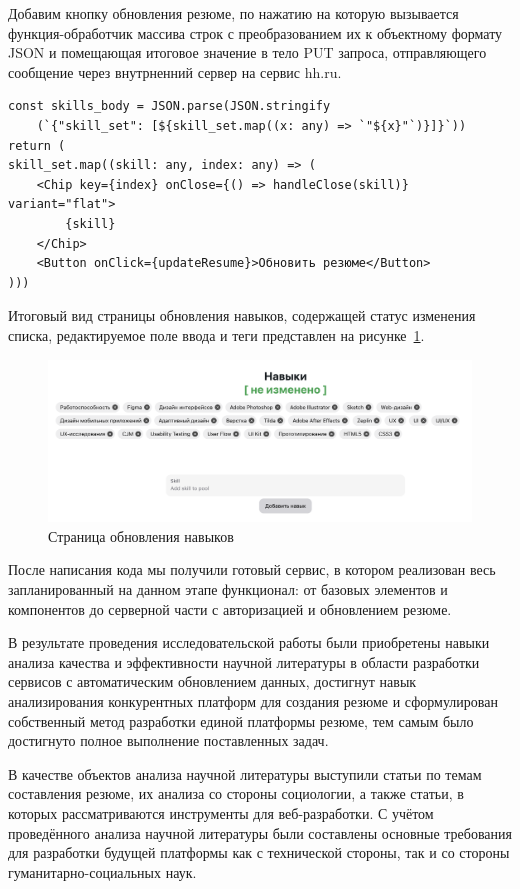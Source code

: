 \documentclass[master, och, diploma]{SCWorks}
\begin{document}
Добавим кнопку обновления резюме, по нажатию на которую вызывается функция-обработчик массива строк с преобразованием их к объектному формату JSON и помещающая итоговое значение в тело PUT запроса, отправляющего сообщение через внутрненний сервер на сервис hh.ru.
\begin{verbatim}
const skills_body = JSON.parse(JSON.stringify
    (`{"skill_set": [${skill_set.map((x: any) => `"${x}"`)}]}`))
return (
skill_set.map((skill: any, index: any) => (
    <Chip key={index} onClose={() => handleClose(skill)} variant="flat">
        {skill}
    </Chip>
    <Button onClick={updateResume}>Обновить резюме</Button>
)))
\end{verbatim}

Итоговый вид страницы обновления навыков, содержащей статус изменения списка, редактируемое поле ввода и теги представлен на рисунке~\ref{fig:32}. 
\begin{figure}[!ht]
    \centering
    \includegraphics[width=12cm]{images/image-update-skills.png}
    \caption{\label{fig:32}%
        Страница обновления навыков}
\end{figure}

После написания кода мы получили готовый сервис, в котором реализован весь запланированный на данном этапе функционал: от базовых элементов и компонентов до серверной части с авторизацией и обновлением резюме.



\newpage
\conclusion
В результате проведения исследовательской работы были приобретены навыки анализа 
качества и эффективности научной литературы в области разработки сервисов 
с автоматическим обновлением данных, достигнут навык анализирования конкурентных 
платформ для создания резюме и сформулирован собственный метод разработки 
единой платформы резюме, тем самым было достигнуто полное выполнение поставленных задач.

В качестве объектов анализа научной литературы выступили статьи по темам составления 
резюме, их анализа со стороны социологии, а также статьи, в которых рассматриваются 
инструменты для веб-разработки. С учётом проведённого анализа научной литературы 
были составлены основные требования для разработки будущей платформы как с технической 
стороны, так и со стороны гуманитарно-социальных наук.
\end{document}
